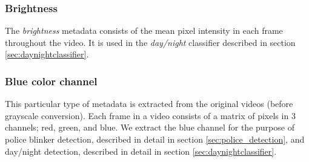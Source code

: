 \subsubsection{Brightness}\label{sec:brightnessdata}
%
The \textit{brightness} metadata consists of the mean pixel intensity in each frame throughout the video. It is used in the \textit{day/night} classifier described in section \ref{sec:daynightclassifier}.
%
\subsubsection{Blue color channel}\label{sec:blue_channel}
%
This particular type of metadata is extracted from the original videos (before grayscale conversion). Each frame in a video consists of a matrix of pixels in 3 channels; red, green, and blue. We extract the blue channel for the purpose of police blinker detection, described in detail in section \ref{sec:police_detection}, and day/night detection, described in detail in section \ref{sec:daynightclassifier}.
%
